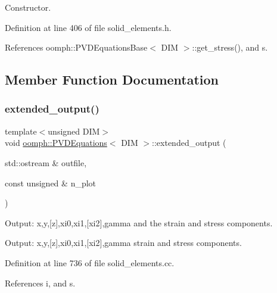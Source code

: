 Constructor. 



Definition at line 406 of file solid\+\_\+elements.\+h.



References oomph\+::\+P\+V\+D\+Equations\+Base$<$ D\+I\+M $>$\+::get\+\_\+stress(), and s.



\subsection{Member Function Documentation}
\mbox{\label{classoomph_1_1PVDEquations_a60ed017dce1a6a98098b8ad3127389c9}} 
\subsubsection{\texorpdfstring{extended\+\_\+output()}{extended\_output()}}
{\footnotesize\ttfamily template$<$unsigned D\+IM$>$ \\
void \hyperlink{classoomph_1_1PVDEquations}{oomph\+::\+P\+V\+D\+Equations}$<$ D\+IM $>$\+::extended\+\_\+output (\begin{DoxyParamCaption}\item[{std\+::ostream \&}]{outfile,  }\item[{const unsigned \&}]{n\+\_\+plot }\end{DoxyParamCaption})}



Output\+: x,y,\mbox{[}z\mbox{]},xi0,xi1,\mbox{[}xi2\mbox{]},gamma and the strain and stress components. 

Output\+: x,y,\mbox{[}z\mbox{]},xi0,xi1,\mbox{[}xi2\mbox{]},gamma strain and stress components. 

Definition at line 736 of file solid\+\_\+elements.\+cc.



References i, and s.

\mbox{\label{classoomph_1_1PVDEquations_a7a84eddfcf9bd10eec76fd4baa739806}} 
